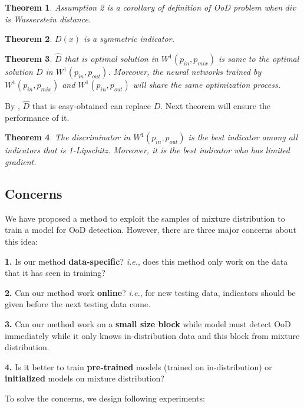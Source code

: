 \documentclass[letterpaper]{article} %
\newtheorem{theorem}{Theorem}
\newcommand{\IE}{\textit{i.e.}, }
\newcommand{\pin}{p_{in}}
\newcommand{\pout}{p_{out}}
\newcommand{\pmix}{p_{mix}}
\begin{document}
\begin{theorem}\label{thm6}
	Assumption 2 is a corollary of definition of OoD problem when $div$ is Wasserstein distance.  
\end{theorem}

\begin{theorem}\label{thm7}
	$D(x)$ is a symmetric indicator. 
\end{theorem}

\begin{theorem}\label{thm8}
	$\hat{D}$ that is optimal solution in $W^1(\pin, \pmix)$ is same to the optimal solution $D$ in $W^1(\pin, \pout)$. Moreover, the neural networks trained by $W^1(\pin, \pmix)$ and $W^1(\pin, \pout)$ will share the same optimization process. 
\end{theorem}

By , $\hat{D}$ that is easy-obtained can replace $D$. Next theorem will ensure the performance of it. 

\begin{theorem}\label{thm9}
	The discriminator in $W^1(\pin, \pout)$ is the best indicator among all indicators that is 1-Lipschitz. Moreover, it is the best indicator who has limited gradient. 
\end{theorem}

\subsection{Concerns}
We have proposed a method to exploit the samples of mixture distribution to train a model for OoD detection. However, there are three major concerns about this idea: 

\noindent \textbf{1.} Is our method \textbf{data-specific}? \IE does this method only work on the data that it has seen in training? 

\noindent \textbf{2.} Can our method work \textbf{online}? \IE for new testing data, indicators should be given before the next testing data come.  

\noindent \textbf{3.} Can our method work on a \textbf{small size block} while model must detect OoD immediately while it only knows in-distribution data and this block from mixture distribution. 

\noindent \textbf{4.} Is it better to train \textbf{pre-trained} models (trained on in-distribution) or \textbf{initialized} models on mixture distribution?

To solve the concerns, we design following experiments:
\end{document}
